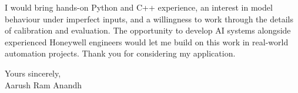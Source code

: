 \documentclass[11pt,a4paper]{article}
\begin{document}
I would bring hands-on Python and C++ experience, an interest in model behaviour under imperfect inputs, and a willingness to work through the details of calibration and evaluation. The opportunity to develop AI systems alongside experienced Honeywell engineers would let me build on this work in real-world automation projects. Thank you for considering my application.\par\vspace{14pt}
Yours sincerely,\\[5pt]
Aarush Ram Anandh
\end{document}
